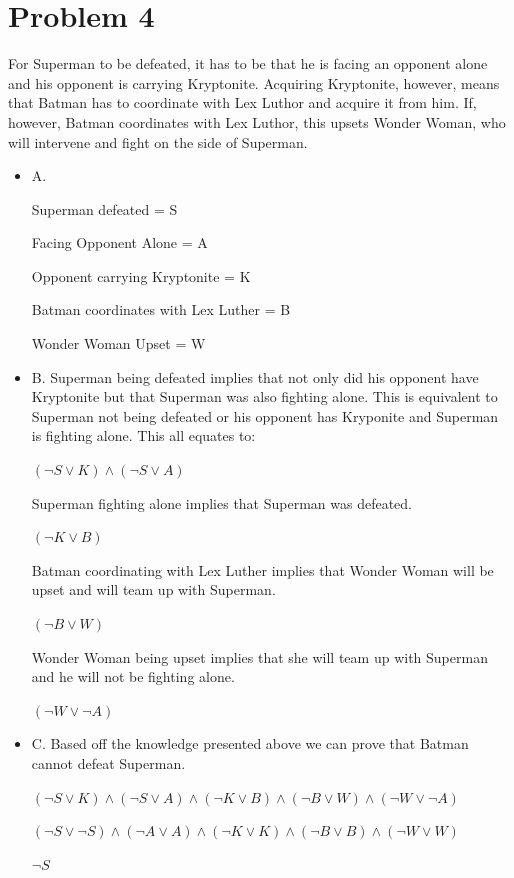 \documentclass[10pt,a4paper]{article}
\begin{document}
	\section*{Problem 4}
	For Superman to be defeated, it has to be that he is facing an opponent alone and his opponent is carrying Kryptonite. Acquiring Kryptonite, however, means that Batman has to coordinate with Lex Luthor and acquire it from him. If, however, Batman coordinates with Lex Luthor, this upsets Wonder Woman, who will intervene and fight on the side of Superman.
	\begin{itemize}
	\item
	A.
	
	Superman defeated = S
	
	Facing Opponent Alone = A
	
	Opponent carrying Kryptonite = K
	
	Batman coordinates with Lex Luther = B
	
	Wonder Woman Upset = W
	
	\item
	B. Superman being defeated implies that not only did his opponent have Kryptonite but that Superman was also fighting alone. This is equivalent to Superman not being defeated or his opponent has Kryponite and Superman is fighting alone. This all equates to: 
	\begin{center}
		$(\neg S \lor K) \land (\neg S \lor A)$
	\end{center}
	
	Superman fighting alone implies that Superman was defeated. 
	\begin{center}
		$(\neg K \lor B)$
	\end{center}
	Batman coordinating with Lex Luther implies that Wonder Woman will be upset and will team up with Superman. 
	\begin{center}
		$(\neg B \lor W)$
	\end{center}
	Wonder Woman being upset implies that she will team up with Superman and he will not be fighting alone.
	\begin{center}
		$(\neg W \lor \neg A)$
	\end{center}
	\item
	C. Based off the knowledge presented above we can prove that Batman cannot defeat Superman. 
	
	\begin{center}
		$(\neg S \lor K) \land (\neg S \lor A) \land (\neg K \lor B) \land (\neg B \lor W) \land (\neg W \lor \neg A)$
		
		$(\neg S \lor \neg S) \land (\neg A \lor A) \land (\neg K \lor K) \land (\neg B \lor B) \land (\neg W \lor W)$
		
		$\neg S$
	\end{center}

	
	
	\end{itemize}
	
\end{document}
